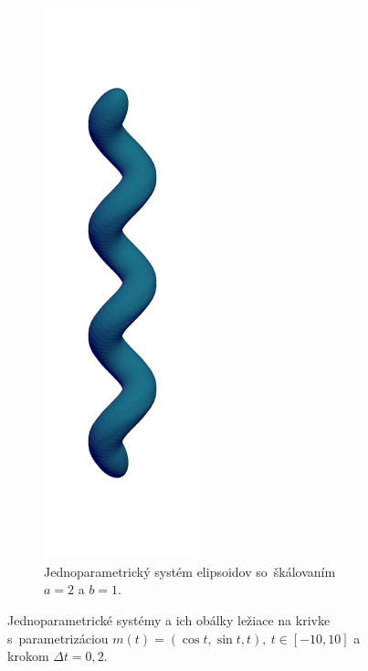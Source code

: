\begin{figure}[t!]
\begin{subfigure}[t]{0.32\textwidth}
        \centering
        \includegraphics[width=0.5\textwidth]{images/helix_ellipsoids.png}
        	\caption{Jednoparametrický systém elipsoidov so~škálovaním $a=2$ a $b=1$.}
        \label{fig:plocha9}
    \end{subfigure}
    	\caption[Jednoparametrické systémy a ich obálky ležiace na krivke skrutkovica.]{Jednoparametrické systémy a ich obálky ležiace na krivke s~parametrizáciou  $m(t)=(\cos t, \sin t, t), \  t \in [-10, 10]$ a krokom $\Delta t = 0,2$.}
    \label{fig:katalogII}
\end{figure}